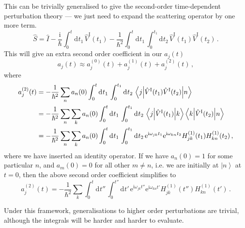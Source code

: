 \documentclass{article}
\theoremstyle{plain}\theoremheaderfont{\normalfont\itshape}\theorembodyfont{\rmfamily}\theoremseparator{.}\newtheorem*{rem}{Remark}\newtheorem*{ex}{Example}\newtheorem*{proof}{Proof}\newtheorem*{altp}{Alternative proof}
\theoremstyle{plain}\theoremheaderfont{\normalfont\bfseries}\theorembodyfont{\rmfamily}\theoremseparator{.}\newtheorem{thm}{Theorem}[section]\newtheorem{lem}[thm]{Lemma}\newtheorem{prop}[thm]{Proposition}\newtheorem*{cor}{Corollary}\newtheorem{defn}[thm]{Definition}\newtheorem{clm}[thm]{Claim}\newtheorem{clminproof}{Claim}
\theoremstyle{break}\theoremheaderfont{\normalfont\itshape}\theorembodyfont{\rmfamily}\theoremseparator{.\medskip}\newtheorem*{proofskip}{Proof}\newtheorem*{exs}{Examples}\newtheorem*{rems}{Remarks}
\theoremstyle{break}\theoremheaderfont{\normalfont\bfseries}\theorembodyfont{\rmfamily}\theoremseparator{.\medskip}\newtheorem{lemskip}[thm]{Lemma}\newtheorem{defnskip}[thm]{Definition}\newtheorem{propskip}[thm]{Proposition}\newtheorem{thmskip}[thm]{Theorem}
\numberwithin{equation}{section}
\newcommand{\ii}{\mathrm{i}}
\newcommand{\ee}{\mathrm{e}}
\newcommand{\dd}[2][]{\mathrm{d}^{#1} #2\,}
\newcommand{\ket}[1]{\left| #1 \right\rangle}
\newcommand{\mel}[3]{\left\langle #1 \middle| #2 \middle| #3 \right\rangle}
\newcommand{\Int}{^{\mathrm{I}}}
\begin{document}
    This can be trivially generalised to give the second-order time-dependent perturbation theory --- we just need to expand the scattering operator by one more term.
    \begin{equation}\label{second_order_scattering_operator}
        \hat{S}=\hat{I}-\frac{\ii}{\hbar}\int_{0}^{t}\dd{t_1}\hat{V}\Int(t_1)-\frac{1}{\hbar^2}\int_{0}^{t}\dd{t_1}\int_{0}^{t_1}\dd{t_2}\hat{V}\Int(t_1)\hat{V}\Int(t_2)\,.
    \end{equation}
    This will give an extra second order coefficient in our \(a_j(t)\)
    \begin{equation}
        a_j(t)\approx a_j^{(0)}(t)+a_j^{(1)}(t)+a_j^{(2)}(t)\,,
    \end{equation}
    where
    \begin{align}
        a_j^{(2)}(t)&=-\frac{1}{\hbar^2}\sum_n a_n(0)\int_{0}^{t}\dd{t_1}\int_{0}^{t_1}\dd{t_2}\mel{j}{\hat{V}\Int(t_1)\hat{V}\Int(t_2)}{n}\notag\\
        &=-\frac{1}{\hbar^2}\sum_n\sum_k a_n(0)\int_{0}^{t}\dd{t_1}\int_{0}^{t_1}\dd{t_2}\mel{j}{\hat{V}\Int(t_1)}{k}\mel{k}{\hat{V}\Int(t_2)}{n}\notag\\
        &=-\frac{1}{\hbar^2}\sum_n\sum_k a_n(0)\int_{0}^{t}\dd{t_1}\int_{0}^{t_1}\dd{t_2}\ee^{\ii\omega_{jk}t_1}\ee^{\ii\omega_{kn}t_2}H_{jk}^{(1)}(t_1)H_{kn}^{(1)}(t_2)\,,
    \end{align}
    where we have inserted an identity operator. If we have \(a_n(0)=1\) for some particular \(n\), and \(a_m(0)=0\) for all other \(m\ne n\), i.e. we are initially at \(\ket{n}\) at \(t=0\), then the above second order coefficient simplifies to
    \begin{equation}
        a_j^{(2)}(t)=-\frac{1}{\hbar^2}\sum_k\int_{0}^{t}\dd{t''}\int_{0}^{t''}\dd{t'}\ee^{\ii\omega_{jk}t''}\ee^{\ii\omega_{kn}t'}H_{jk}^{(1)}(t'')H_{kn}^{(1)}(t')\,.
    \end{equation}

    Under this framework, generalisations to higher order perturbations are trivial, although the integrals will be harder and harder to evaluate.
\end{document}
